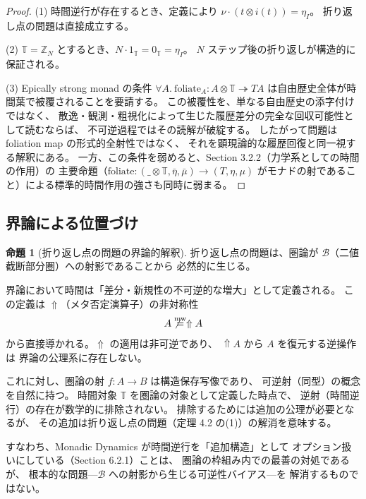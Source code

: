 \documentclass[11pt,a4paper]{ltjsarticle}
\newcommand{\mweq}{\mathrel{\overset{\mathrm{mw}}{=}}}
\newcommand{\metanegation}{\Uparrow}
\newcommand{\Bval}{\mathcal{B}}
\theoremstyle{definition}
\newtheorem{proposition}{命題}[section]
\begin{document}
\begin{proof}
(1) 時間逆行が存在するとき、定義により $\nu \cdot (t \otimes i(t)) = \eta_I$。
折り返し点の問題は直接成立する。

(2) $\mathbb{T} = \mathbb{Z}_N$ とするとき、$N \cdot 1_{\mathbb{T}} = 0_{\mathbb{T}} = \eta_I$。
$N$ ステップ後の折り返しが構造的に保証される。

(3) Epically strong monad の条件
$\forall A.\ \mathrm{foliate}_A: A \otimes \mathbb{T} \twoheadrightarrow TA$
は自由歴史全体が時間葉で被覆されることを要請する。
この被覆性を、単なる自由歴史の添字付けではなく、
散逸・観測・粗視化によって生じた履歴差分の完全な回収可能性として読むならば、
不可逆過程ではその読解が破綻する。
したがって問題は foliation map の形式的全射性ではなく、
それを顕現論的な履歴回復と同一視する解釈にある。
一方、この条件を弱めると、Section 3.2.2（力学系としての時間の作用）の
主要命題（$\mathrm{foliate}: (\_ \otimes \mathbb{T}, \bar\eta, \bar\mu) \to (T, \eta, \mu)$
がモナドの射であること）による標準的時間作用の強さも同時に弱まる。
\end{proof}

\subsection{界論による位置づけ}

\begin{proposition}[折り返し点の問題の界論的解釈]
折り返し点の問題は、圏論が $\Bval$（二値截断部分圏）への射影であることから
必然的に生じる。

界論において時間は「差分・新規性の不可逆的な増大」として定義される。
この定義は $\metanegation$（メタ否定演算子）の非対称性
\[
A \not\mweq \metanegation A
\]
から直接導かれる。$\metanegation$ の適用は非可逆であり、
$\metanegation A$ から $A$ を復元する逆操作は
界論の公理系に存在しない。

これに対し、圏論の射 $f: A \to B$ は構造保存写像であり、
可逆射（同型）の概念を自然に持つ。
時間対象 $\mathbb{T}$ を圏論の対象として定義した時点で、
逆射（時間逆行）の存在が数学的に排除されない。
排除するためには追加の公理が必要となるが、
その追加は折り返し点の問題（定理 4.2 の(1)）の解消を意味する。

すなわち、Monadic Dynamics が時間逆行を「追加構造」として
オプション扱いにしている（Section 6.2.1）ことは、
圏論の枠組み内での最善の対処であるが、
根本的な問題---$\Bval$ への射影から生じる可逆性バイアス---を
解消するものではない。
\end{proposition}
\end{document}
